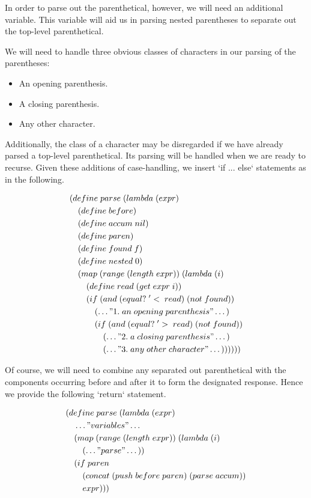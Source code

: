 \documentclass[11pt]{article}
\begin{document}
In order to parse out the parenthetical, however, we will need an additional variable. This variable will aid us in parsing nested parentheses to separate out the top-level parenthetical.

We will need to handle three obvious classes of characters in our parsing of the parentheses:

\begin{itemize}
  \item An opening parenthesis.
  \item A closing parenthesis.
  \item Any other character.
\end{itemize}

Additionally, the class of a character may be disregarded if we have already parsed a top-level parenthetical. Its parsing will be handled when we are ready to recurse. Given these additions of case-handling, we insert `if ... else` statements as in the following.

\begin{align*}
& (define \; parse \; (lambda \; (expr) \; 
\\& \quad (define \; before)
\\& \quad (define \; accum \; nil)
\\& \quad (define \; paren)
\\& \quad (define \; found \; f)
\\& \quad (define \; nested \; 0)
\\& \quad (map \; (range \; (length \; expr)) \; (lambda \; (i)
\\& \qquad (define \; read \; (get \; expr \; i))
\\& \qquad (if \; (and \; (equal? \; '< \; read) \; (not \; found))
\\& \qquad \quad (\dots"1. \; an \; opening \; parenthesis"\dots)
\\& \qquad \quad (if \; (and \; (equal? \; '> \; read) \; (not \; found))
\\& \qquad \qquad (\dots"2. \; a \; closing \; parenthesis"\dots)
\\& \qquad \qquad (\dots"3. \; any \; other \; character"\dots))))))
\end{align*}

Of course, we will need to combine any separated out parenthetical with the components occurring before and after it to form the designated response. Hence we provide the following `return` statement.

\begin{align*}
& (define \; parse \; (lambda \; (expr) \; 
\\& \quad \dots"variables"\dots
\\& \quad (map \; (range \; (length \; expr)) \; (lambda \; (i)
\\& \qquad (\dots"parse"\dots))
\\& \quad (if \; paren
\\& \qquad (concat \; (push \; before \; paren) \; (parse \; accum))
\\& \qquad expr)))
\end{align*}
\end{document}
